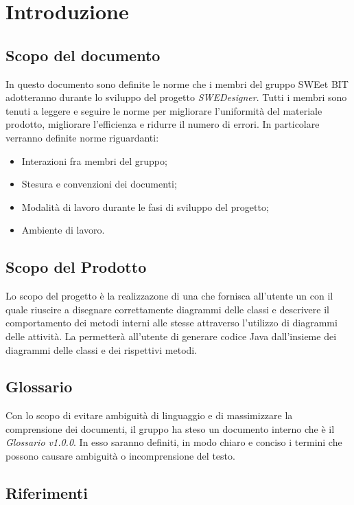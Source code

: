 \section{Introduzione}
  \subsection{Scopo del documento}
          In questo documento sono definite le norme che i membri del gruppo SWEet BIT adotteranno durante lo sviluppo del progetto \emph{SWEDesigner}.
          Tutti i membri sono tenuti a leggere e seguire le norme per migliorare l’uniformità del materiale prodotto, migliorare l’efficienza
          e ridurre il numero di errori.
          In particolare verranno definite norme riguardanti:
            \begin{itemize}
              \item Interazioni fra membri del gruppo;
              \item Stesura e convenzioni dei documenti;
              \item Modalità di lavoro durante le fasi di sviluppo del progetto;
              \item Ambiente di lavoro.
            \end{itemize}
  \subsection{Scopo del Prodotto}
          Lo scopo del progetto è la realizzazone di una  che fornisca all'utente un   con il quale riuscire a disegnare correttamente diagrammi delle classi
          e descrivere il comportamento dei metodi interni alle stesse attraverso l'utilizzo di diagrammi delle attività.
          La  permetterà all'utente di generare codice Java dall'insieme dei diagrammi delle classi e dei rispettivi metodi.
  \subsection{Glossario}
          Con lo scopo di evitare ambiguità di linguaggio e di massimizzare la comprensione dei documenti, il
          gruppo ha steso un documento interno che è il \emph{Glossario v1.0.0}. In esso saranno definiti, in modo
          chiaro e conciso i termini che possono causare ambiguità o incomprensione del testo.
  \subsection{Riferimenti}

